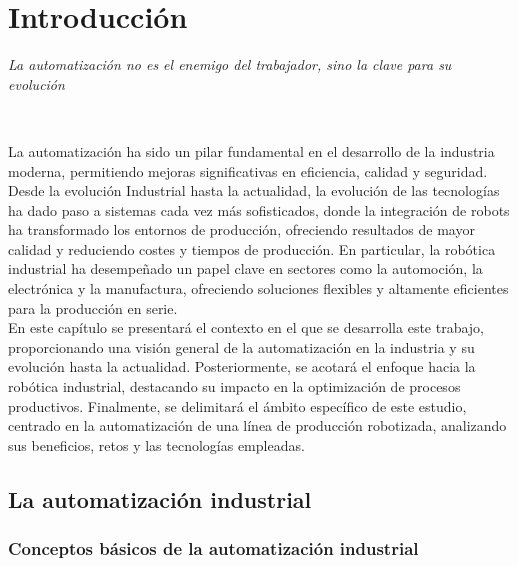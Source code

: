\chapter{Introducción}
\label{cap:capitulo1}
\setcounter{page}{1}

\begin{flushright}
\begin{minipage}[]{10cm}
\emph{La automatización no es el enemigo del trabajador, sino la clave para su evolución}\\
\end{minipage}\\
\end{flushright}

\vspace{1cm}

La automatización ha sido un pilar fundamental en el desarrollo de la industria moderna, permitiendo mejoras significativas en eficiencia, calidad y seguridad. Desde la evolución Industrial hasta la actualidad, la evolución de las tecnologías ha dado paso a sistemas cada vez más sofisticados, donde la integración de robots ha transformado los entornos de producción, ofreciendo resultados de mayor calidad y reduciendo costes y tiempos de producción. En particular, la robótica industrial ha desempeñado un papel clave en sectores como la automoción, la electrónica y la manufactura, ofreciendo soluciones flexibles y altamente eficientes para la producción en serie.\\

En este capítulo se presentará el contexto en el que se desarrolla este trabajo, proporcionando una visión general de la automatización en la industria y su evolución hasta la actualidad. Posteriormente, se acotará el enfoque hacia la robótica industrial, destacando su impacto en la optimización de procesos productivos. Finalmente, se delimitará el ámbito específico de este estudio, centrado en la automatización de una línea de producción robotizada, analizando sus beneficios, retos y las tecnologías empleadas.

\section{La automatización industrial}
\label{sec:miseccion} %

\subsection{Conceptos básicos de la automatización industrial}

